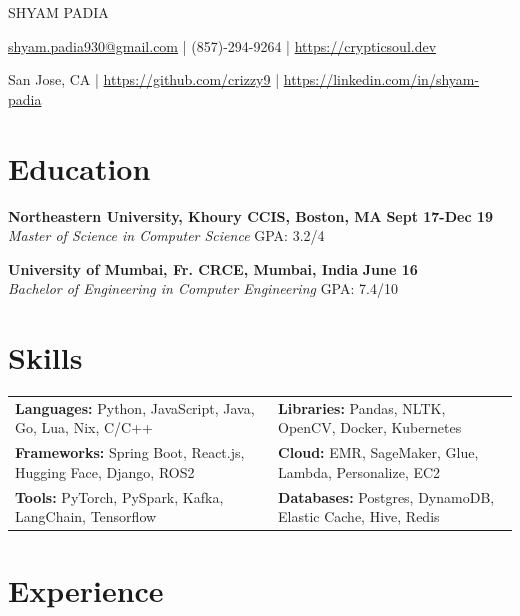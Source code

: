 \documentclass[10pt, letterpaper]{article}
\newcommand{\name}[1]{\centerline{\Huge \scshape {#1}}}
\newcommand{\contactinfo}[1]{\centerline{\large #1}}
\begin{document}

\name{SHYAM PADIA}
\contactinfo{
	\href{mailto:shyam.padia930@gmail.com}{shyam.padia930@gmail.com} |
	(857)-294-9264 |
	\href{https://crypticsoul.dev}{https://crypticsoul.dev}
}
\contactinfo{
	San Jose, CA |
	\href{https://github.com/crizzy9}{https://github.com/crizzy9} |
	\href{https://linkedin.com/in/shyam-padia}{https://linkedin.com/in/shyam-padia}
}

\section{Education}

\noindent\textbf{Northeastern University, Khoury CCIS, Boston, MA} \hfill \textbf{Sept 17-Dec 19} \\
\textit{Master of Science in Computer Science} \hfill GPA: 3.2/4

\vspace{5pt}

\noindent\textbf{University of Mumbai, Fr. CRCE, Mumbai, India} \hfill \textbf{June 16} \\
\textit{Bachelor of Engineering in Computer Engineering} \hfill GPA: 7.4/10

\section{Skills}
\noindent
\begin{tabularx}{\textwidth}{@{} X X @{}}
	\textbf{Languages:} Python, JavaScript, Java, Go, Lua, Nix, C/C++      & \textbf{Libraries:} Pandas, NLTK, OpenCV, Docker, Kubernetes       \\
	\textbf{Frameworks:} Spring Boot, React.js, Hugging Face, Django, ROS2 & \textbf{Cloud:} EMR, SageMaker, Glue, Lambda, Personalize, EC2     \\
	\textbf{Tools:} PyTorch, PySpark, Kafka, LangChain, Tensorflow         & \textbf{Databases:} Postgres, DynamoDB, Elastic Cache, Hive, Redis \\
\end{tabularx}

\section{Experience}
\end{document}
